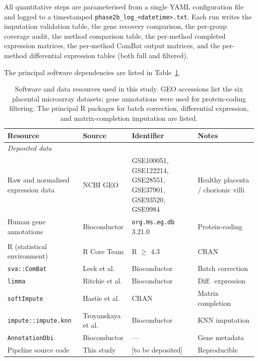 \documentclass[11pt,a4paper]{article}
\begin{document}
All quantitative steps are parameterised from a single YAML
configuration file and logged to a timestamped
\texttt{phase2b\_log\_<datetime>.txt}. Each run writes the
imputation validation table, the gene recovery comparison, the
per-group coverage audit, the method comparison table, the
per-method completed expression matrices, the per-method ComBat
output matrices, and the per-method differential expression
tables (both full and filtered).

The principal software dependencies are listed in
Table~\ref{tab:resources}.

\begin{table}[h]
\centering
\footnotesize
\begin{tabularx}{\textwidth}{@{}l l X l@{}}
\toprule
\textbf{Resource} & \textbf{Source} & \textbf{Identifier} & \textbf{Notes} \\
\midrule
\multicolumn{4}{l}{\emph{Deposited data}} \\
Raw and normalised expression data & NCBI GEO & GSE100051, GSE122214, GSE28551, GSE37901, GSE93520, GSE9984 & Healthy placenta / chorionic villi \\
Human gene annotations & Bioconductor & \texttt{org.Hs.eg.db} 3.21.0 & Protein-coding \\
\addlinespace
\multicolumn{4}{l}{\emph{Software and algorithms}} \\
R (statistical environment) & R Core Team & R $\ge$ 4.3 & CRAN \\
\texttt{sva::ComBat} & Leek et al. & Bioconductor & Batch correction \\
\texttt{limma} & Ritchie et al. & Bioconductor & Diff.\ expression \\
\texttt{softImpute} & Hastie et al. & CRAN & Matrix completion \\
\texttt{impute::impute.knn} & Troyanskaya et al. & Bioconductor & KNN imputation \\
\texttt{AnnotationDbi} & Bioconductor & --- & Gene metadata \\
Pipeline source code & This study & [to be deposited] & Reproducible \\
\bottomrule
\end{tabularx}
\caption{Software and data resources used in this study. GEO
  accessions list the six placental microarray datasets; gene
  annotations were used for protein-coding filtering. The
  principal R packages for batch correction, differential
  expression, and matrix-completion imputation are listed.}
\label{tab:resources}
\end{table}
\end{document}
